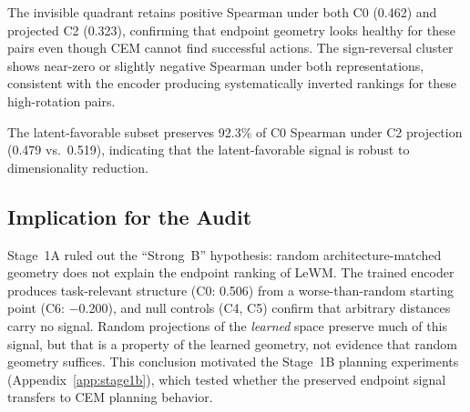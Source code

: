 The invisible quadrant retains positive Spearman under both C0 (0.462) and
projected C2 (0.323), confirming that endpoint geometry looks healthy for
these pairs even though CEM cannot find successful actions.  The
sign-reversal cluster shows near-zero or slightly negative Spearman under
both representations, consistent with the encoder producing systematically
inverted rankings for these high-rotation pairs.

The latent-favorable subset preserves 92.3\% of C0 Spearman under C2
projection (0.479 vs.\ 0.519), indicating that the latent-favorable signal
is robust to dimensionality reduction.

\subsection{Implication for the Audit}

Stage~1A ruled out the ``Strong~B'' hypothesis: random
architecture-matched geometry does not explain the endpoint ranking of LeWM.
The trained encoder produces task-relevant structure (C0: 0.506) from a
worse-than-random starting point (C6: $-$0.200), and null controls
(C4, C5) confirm that arbitrary distances carry no signal.  Random
projections of the \emph{learned} space preserve much of this signal, but
that is a property of the learned geometry, not evidence that random
geometry suffices.  This conclusion motivated the Stage~1B planning
experiments (Appendix~\ref{app:stage1b}), which tested whether the preserved
endpoint signal transfers to CEM planning behavior.
